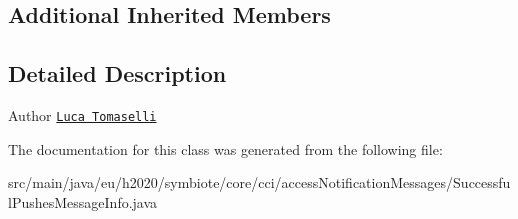 \subsection*{Additional Inherited Members}


\subsection{Detailed Description}
\begin{DoxyAuthor}{Author}
\href{mailto:l.tomaselli@nextworks.it}{\tt Luca Tomaselli} 
\end{DoxyAuthor}


The documentation for this class was generated from the following file\+:\begin{DoxyCompactItemize}
\item 
src/main/java/eu/h2020/symbiote/core/cci/access\+Notification\+Messages/Successful\+Pushes\+Message\+Info.\+java\end{DoxyCompactItemize}
